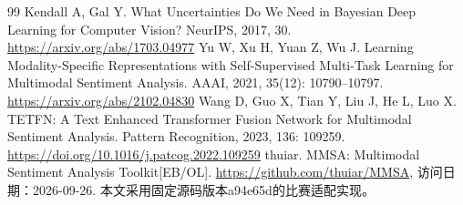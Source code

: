 \begin{thebibliography}{99}
Kendall A, Gal Y. What Uncertainties Do We Need in Bayesian Deep Learning for Computer Vision? NeurIPS, 2017, 30. \url{https://arxiv.org/abs/1703.04977}
Yu W, Xu H, Yuan Z, Wu J. Learning Modality-Specific Representations with Self-Supervised Multi-Task Learning for Multimodal Sentiment Analysis. AAAI, 2021, 35(12): 10790--10797. \url{https://arxiv.org/abs/2102.04830}
Wang D, Guo X, Tian Y, Liu J, He L, Luo X. TETFN: A Text Enhanced Transformer Fusion Network for Multimodal Sentiment Analysis. Pattern Recognition, 2023, 136: 109259. \url{https://doi.org/10.1016/j.patcog.2022.109259}
thuiar. MMSA: Multimodal Sentiment Analysis Toolkit{[}EB/OL{]}. \url{https://github.com/thuiar/MMSA,} 访问日期：2026-09-26. 本文采用固定源码版本a94e65d的比赛适配实现。
\end{thebibliography}
